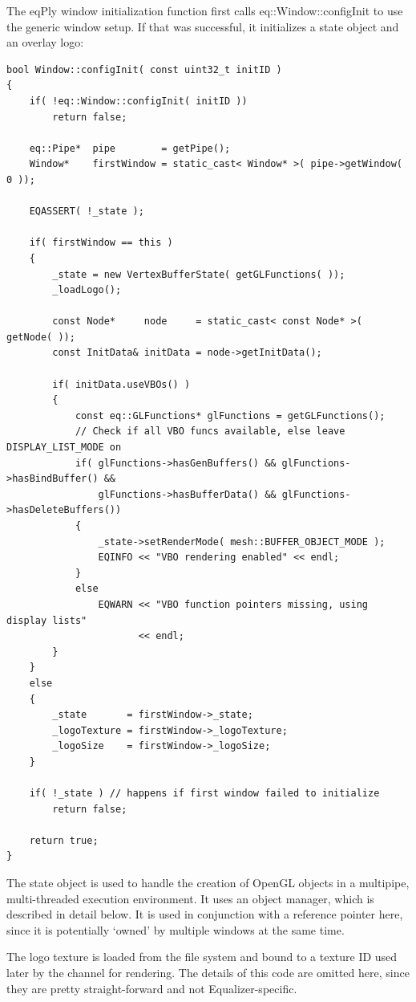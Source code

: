 \documentclass[10pt,a4]{scrartcl}
\begin{document}
The \textsf{eqPly} window initialization function first calls
\textsf{eq::Window::configInit} to use the generic window setup. If that
was successful, it initializes a state object and an overlay logo:

{\footnotesize\begin{lstlisting}
bool Window::configInit( const uint32_t initID )
{
    if( !eq::Window::configInit( initID ))
        return false;

    eq::Pipe*  pipe        = getPipe();
    Window*    firstWindow = static_cast< Window* >( pipe->getWindow( 0 ));

    EQASSERT( !_state );

    if( firstWindow == this )
    {
        _state = new VertexBufferState( getGLFunctions( ));
        _loadLogo();

        const Node*     node     = static_cast< const Node* >( getNode( ));
        const InitData& initData = node->getInitData();

        if( initData.useVBOs() )
        {
            const eq::GLFunctions* glFunctions = getGLFunctions();
            // Check if all VBO funcs available, else leave DISPLAY_LIST_MODE on
            if( glFunctions->hasGenBuffers() && glFunctions->hasBindBuffer() &&
                glFunctions->hasBufferData() && glFunctions->hasDeleteBuffers())
            {
                _state->setRenderMode( mesh::BUFFER_OBJECT_MODE );
                EQINFO << "VBO rendering enabled" << endl;
            }
            else
                EQWARN << "VBO function pointers missing, using display lists" 
                       << endl;
        }
    }
    else
    {
        _state       = firstWindow->_state;
        _logoTexture = firstWindow->_logoTexture;
        _logoSize    = firstWindow->_logoSize;
    }

    if( !_state ) // happens if first window failed to initialize
        return false;
    
    return true;
}
\end{lstlisting}}%

The state object is used to handle the creation of OpenGL objects in a
multipipe, multi-threaded execution environment. It uses an object
manager, which is described in detail below. It is used in conjunction
with a reference pointer here, since it is potentially `owned' by
multiple windows at the same time.

The logo texture is loaded from the file system and bound to a texture
ID used later by the channel for rendering. The details of this code are
omitted here, since they are pretty straight-forward and not
Equalizer-specific.
\end{document}
